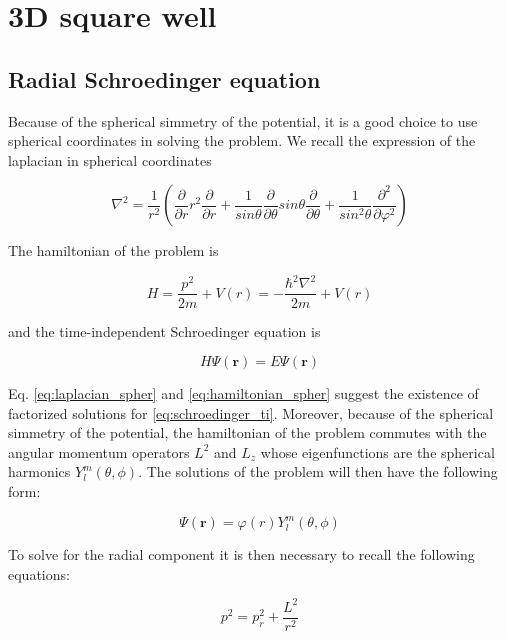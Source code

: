 \documentclass{article}
\begin{document}
\section{3D square well}

\subsection{Radial Schroedinger equation}
Because of the spherical simmetry of the potential, it is a good choice to use spherical coordinates in solving the problem. We recall the expression of the laplacian in spherical coordinates

\begin{equation}
\label{eq:laplacian_spher}
\nabla^2 = \frac{1}{r^2} \left( \frac{\partial}{\partial r} r^2 \frac{\partial}{\partial r} + \frac{1}{sin\theta} \frac{\partial}{\partial \theta} sin\theta \frac{\partial}{\partial \theta} + \frac{1}{sin^2\theta} \frac{\partial^2}{\partial \varphi^2} \right)
\end{equation}

The hamiltonian of the problem is

\begin{equation}
\label{eq:hamiltonian_spher}
H = \frac{p^2}{2m} + V(r) = -\frac{\hbar^2 \nabla^2}{2m} + V(r)
\end{equation}

and the time-independent Schroedinger equation is

\begin{equation}
\label{eq:schroedinger_ti}
H\Psi(\bm{r}) = E\Psi(\bm{r})
\end{equation}

Eq. \eqref{eq:laplacian_spher} and \eqref{eq:hamiltonian_spher} suggest the existence of factorized solutions for \eqref{eq:schroedinger_ti}. Moreover, because of the spherical simmetry of the potential, the hamiltonian of the problem commutes with the angular momentum operators \(L^2\) and \(L_{z}\) whose eigenfunctions are the spherical harmonics \(Y_{l}^m(\theta,\phi)\). The solutions of the problem will then have the following form:

\begin{equation}
\label{eq:factorized_psi}
\Psi(\bm{r}) = \varphi(r) Y_{l}^m(\theta,\phi)
\end{equation}

To solve for the radial component it is then necessary to recall the following equations:

\begin{equation}
\label{eq:p2_decomposed}
p^2 = p_{r}^2 + \frac{L^2}{r^2}
\end{equation}
\end{document}
